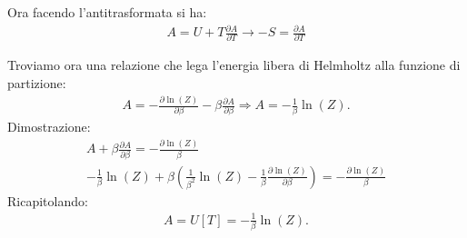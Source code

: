 Ora facendo l'antitrasformata si ha:
\begin{equation}\begin{split}
A=U+T\frac{\partial A}{\partial T} \longrightarrow -S=\frac{\partial A}{\partial T}
\end{split}\end{equation}

Troviamo ora una relazione che lega l'energia libera di Helmholtz alla funzione di partizione:
\begin{equation}\begin{split}
A=-\frac{\partial \ln{\left(Z\right)}}{\partial \beta}-\beta\frac{\partial A}{\partial \beta} \Longrightarrow A=-\frac{1}{\beta}\ln{\left(Z\right)}.
\end{split}\end{equation}
Dimostrazione:
\begin{equation}\begin{split}
A+\beta\frac{\partial A}{\partial \beta}=-\frac{\partial \ln{\left(Z\right)}}{\beta} \\
-\frac{1}{\beta}\ln{\left(Z\right)}+\beta\left(\frac{1}{\beta^2}\ln{\left(Z\right)}-\frac{1}{\beta}\frac{\partial \ln{\left(Z\right)}}{\partial \beta}\right)=-\frac{\partial \ln{\left(Z\right)}}{\beta}
\end{split}\end{equation}
Ricapitolando: 
\begin{equation}\begin{split}
A=U\left[T\right]=-\frac{1}{\beta}\ln{\left(Z\right)}.
\end{split}\end{equation}

